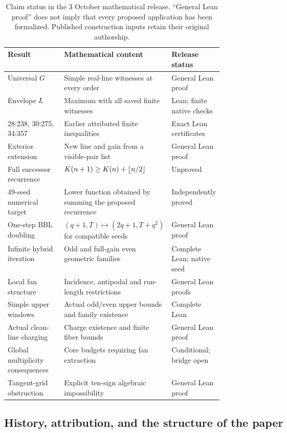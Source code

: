 \begin{table}[tbp]
\centering\small
\begin{tabularx}{\linewidth}{@{}P{0.28\linewidth}XP{0.21\linewidth}@{}}
\toprule
Result & Mathematical content & Release status\\
\midrule
Universal $G$ & Simple real-line witnesses at every order & General Lean proof\\
Envelope $L$ & Maximum with all saved finite witnesses & Lean; finite native checks\\
28:238, 30:275, 34:357 & Earlier attributed finite inequalities & Exact Lean certificates\\
Exterior extension & New line and gain from a visible-pair list & General Lean proof\\
Full successor recurrence & $K(n+1)\ge K(n)+\left\lfloor n/2\right\rfloor$ & Unproved\\
49-seed numerical target & Lower function obtained by summing the proposed recurrence & Independently proved\\
One-step BBL doubling & $(q+1,T)\mapsto(2q+1,T+q^2)$ for compatible seeds & General Lean proof\\
Infinite hybrid iteration & Odd and full-gain even geometric families & Complete Lean; native seed\\
Local fan structure & Incidence, antipodal and run-length restrictions & General Lean proofs\\
Simple upper windows & Actual odd/even upper bounds and family existence & Complete Lean\\
Actual clean-line charging & Charge existence and finite fiber bounds & General Lean proof\\
Global multiplicity consequences & Core budgets requiring fan extraction & Conditional; bridge open\\
Tangent-grid obstruction & Explicit ten-sign algebraic impossibility & General Lean proof\\
\bottomrule
\end{tabularx}
\caption{Claim status in the 3 October mathematical release. ``General Lean proof'' does not imply that every proposed application has been formalized. Published construction inputs retain their original authorship.}\label{tab:claims}
\end{table}

\subsection{History, attribution, and the structure of the paper}

